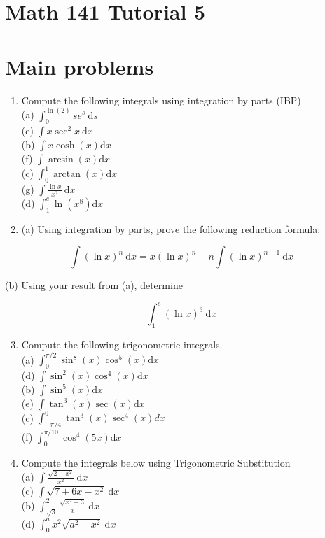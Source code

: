 \documentclass[10pt]{article}
\begin{document}
\section*{Math 141 Tutorial 5}
\section*{Main problems}
\begin{enumerate}
  \item Compute the following integrals using integration by parts (IBP)\\
(a) $\int_{0}^{\ln (2)} s e^{s} \mathrm{~d} s$\\
(e) $\int x \sec ^{2} x \mathrm{~d} x$\\
(b) $\int x \cosh (x) \mathrm{d} x$\\
(f) $\int \arcsin (x) \mathrm{d} x$\\
(c) $\int_{0}^{1} \arctan (x) \mathrm{d} x$\\
(g) $\int \frac{\ln x}{x^{2}} \mathrm{~d} x$\\
(d) $\int_{1}^{e} \ln \left(x^{8}\right) \mathrm{d} x$
  \item (a) Using integration by parts, prove the following reduction formula:
\end{enumerate}

$$
\int(\ln x)^{n} \mathrm{~d} x=x(\ln x)^{n}-n \int(\ln x)^{n-1} \mathrm{~d} x
$$

(b) Using your result from (a), determine

$$
\int_{1}^{e}(\ln x)^{3} \mathrm{~d} x
$$

\begin{enumerate}
  \setcounter{enumi}{2}
  \item Compute the following trigonometric integrals.\\
(a) $\int_{0}^{\pi / 2} \sin ^{8}(x) \cos ^{5}(x) \mathrm{d} x$\\
(d) $\int \sin ^{2}(x) \cos ^{4}(x) \mathrm{d} x$\\
(b) $\int \sin ^{5}(x) \mathrm{d} x$\\
(e) $\int \tan ^{3}(x) \sec (x) \mathrm{d} x$\\
(c) $\int_{-\pi / 4}^{0} \tan ^{3}(x) \sec ^{4}(x) d x$\\
(f) $\int_{0}^{\pi / 10} \cos ^{4}(5 x) \mathrm{d} x$
  \item Compute the integrals below using Trigonometric Substitution\\
(a) $\int \frac{\sqrt{2-x^{2}}}{x^{2}} \mathrm{~d} x$\\
(c) $\int \sqrt{7+6 x-x^{2}} \mathrm{~d} x$\\
(b) $\int_{\sqrt{3}}^{2} \frac{\sqrt{x^{2}-3}}{x} \mathrm{~d} x$\\
(d) $\int_{0}^{a} x^{2} \sqrt{a^{2}-x^{2}} \mathrm{~d} x$
\end{enumerate}
\end{document}

